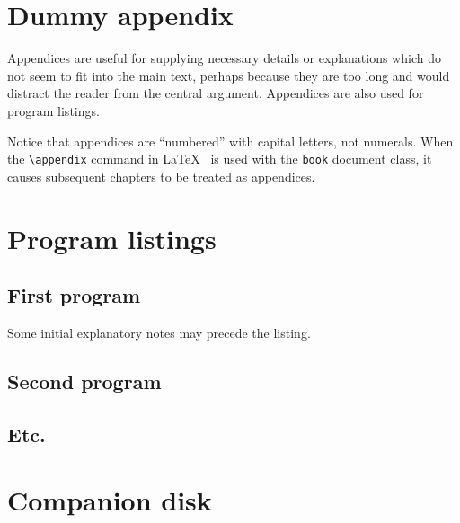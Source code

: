 \documentclass[12pt,openany,a4paper]{book}
\begin{document}

\newpage
{}
\mbox{}
\newpage



\chapter{Dummy appendix}

Appendices are useful for supplying necessary details or explanations
which do not seem to fit into the main text, perhaps because they are
too long and would distract the reader from the central argument.
Appendices are also used for program listings.

Notice that appendices are ``numbered'' with capital letters, not
numerals.  When the \verb+\appendix+ command in
\LaTeX~\cite[p.\,175]{lamport} is used with the \texttt{book} document
class, it causes subsequent chapters to be treated as appendices.

\chapter{Program listings}

\section{First program}

Some initial explanatory notes may precede the listing.

\section{Second program}

\section{Etc.}

\chapter{Companion disk}
\end{document}
